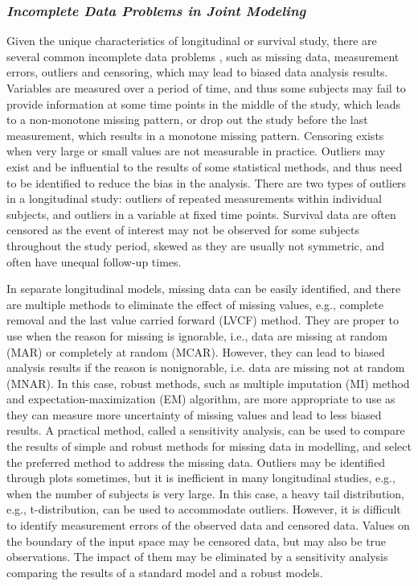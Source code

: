 \subsubsection*{\textit{Incomplete Data Problems in Joint Modeling}}


Given the unique characteristics of longitudinal or survival study, there are several common incomplete data problems \cite{wu2009mixed}, such as missing data, measurement errors, outliers and censoring, which may lead to biased data analysis results. Variables are measured over a period of time, and thus some subjects may fail to provide information at some time points in the middle of the study, which leads to a non-monotone missing pattern, or drop out the study before the last measurement, which results in a monotone missing pattern. Censoring exists when very large or small values are not measurable in practice. Outliers may exist and be influential to the results of some statistical methods, and thus need to be identified to reduce the bias in the analysis. There are two types of outliers in a longitudinal study: outliers of repeated measurements within individual subjects, and outliers in a variable at fixed time points. Survival data are often censored as the event of interest may not be observed for some subjects throughout the study period, skewed as they are usually not symmetric, and often have unequal follow-up times.


In separate longitudinal models, missing data can be easily identified, and there are multiple methods to eliminate the effect of missing values, e.g., complete removal and the last value carried forward (LVCF) method.
They are proper to use when the reason for missing is ignorable, i.e., data are missing at random (MAR) or completely at random (MCAR). However, they can lead to biased analysis results if the reason is nonignorable, i.e. data are missing not at random (MNAR). In this case, robust methods, such as multiple imputation (MI) method and expectation-maximization (EM) algorithm, are more appropriate to use as they can measure more uncertainty of missing values and lead to less biased results. A practical method, called a sensitivity analysis, can be used to compare the results of simple and robust methods for missing data in modelling, and select the preferred method to address the missing data. Outliers may be identified through plots sometimes, but it is inefficient in many longitudinal studies, e.g., when the number of subjects is very large. In this case, a heavy tail distribution, e.g., t-distribution, can be used to accommodate outliers. 
However, it is difficult to identify measurement errors of the observed data and censored data. Values on the boundary of the input space may be censored data, but may also be true observations. The impact of them may be eliminated by a sensitivity analysis comparing the results of a standard model and a robust models.


